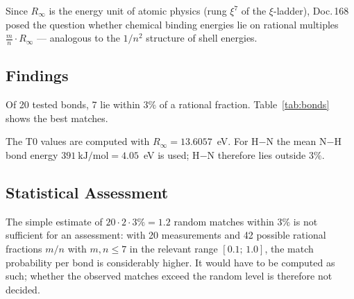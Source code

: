Since $R_\infty$ is the energy unit of atomic physics (rung $\xi^7$ of the
$\xi$-ladder), Doc.\,168 posed the question whether chemical binding energies
lie on rational multiples $\frac{m}{n} \cdot R_\infty$ — analogous to the
$1/n^2$ structure of shell energies.

\subsection{Findings}
\label{subsec:findings-be}

Of 20 tested bonds, 7 lie within $3\%$ of a rational fraction.
Table~\ref{tab:bonds} shows the best matches.

\begin{table}[htbp]
\centering
\caption{Binding energies on rational multiples of $R_\infty$ (NIST values)}
\label{tab:bonds}
\end{table}
The T0 values are computed with $R_\infty = 13.6057$~eV. For H$-$N the mean N$-$H bond energy $391~\text{kJ/mol} = 4.05$~eV is used; H$-$N therefore lies outside $3\%$.

\subsection{Statistical Assessment}
\label{subsec:statistics-be}

The simple estimate of $20 \cdot 2 \cdot 3\% = 1.2$ random matches within $3\%$
is not sufficient for an assessment: with 20 measurements and 42 possible
rational fractions $m/n$ with $m,n \leq 7$ in the relevant range $[0.1;\, 1.0]$,
the match probability per bond is considerably higher. It would have to be
computed as such; whether the observed matches exceed the random level is
therefore not decided.

